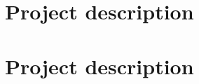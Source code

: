 \documentclass[a4paper,oneside]{report}
\begin{document}
\hypersetup{pageanchor=false}
\tableofcontents
{}
\hypersetup{pageanchor=true}

\part{Project description}






\part{Project description}

\end{document}
